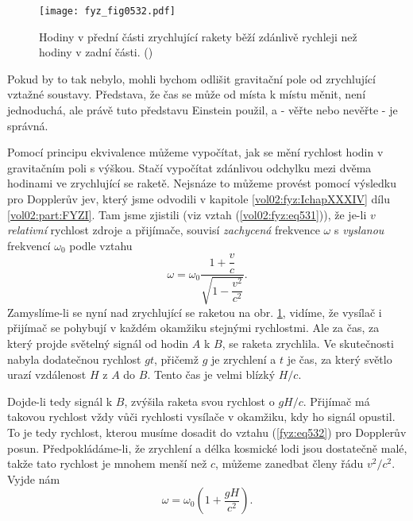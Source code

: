     \begin{figure}[ht!] %
      \centering
      \texttt{[image: fyz\_fig0532.pdf]}
      \caption{Hodiny v přední části zrychlující rakety běží zdánlivě rychleji než hodiny v zadní 
               části. (\cite[s.~787]{Feynman02})}
      \label{fyz:fig0532}
    \end{figure}
    
    Pokud by to tak nebylo, mohli bychom odlišit gravitační pole od zrychlující vztažné soustavy. 
    Představa, že čas se může od místa k místu měnit, není jednoduchá, ale právě tuto představu 
    Einstein použil, a - věřte nebo nevěřte - je správná.
    
    Pomocí principu ekvivalence můžeme vypočítat, jak se mění rychlost hodin v gravitačním poli s
    výškou. Stačí vypočítat zdánlivou odchylku mezi dvěma hodinami ve zrychlující se raketě.
    Nejsnáze to můžeme provést pomocí výsledku pro Dopplerův jev, který jsme odvodili v kapitole
    \ref{vol02:fyz:IchapXXXIV} dílu \ref{vol02:part:FYZI}. Tam jsme zjistili (viz vztah
    (\ref{vol02:fyz:eq531})), že je-li \(v\) \emph{relativní} rychlost zdroje a přijímače, souvisí
    \emph{zachycená} frekvence \(\omega\) s \emph{vyslanou} frekvencí \(\omega_0\) podle vztahu
    \begin{equation}\label{fyz:eq532}
      \omega = \omega_0\dfrac{1+\dfrac{v}{c}}{\sqrt{1-\dfrac{v^2}{c^2}}}.
    \end{equation}
    Zamyslíme-li se nyní nad zrychlující se raketou na obr. \ref{fyz:fig0532}, vidíme, že vysílač i 
    přijímač se pohybují v každém okamžiku stejnými rychlostmi. Ale za čas, za který projde 
    světelný signál od hodin \(A\) k \(B\), se raketa zrychlila. Ve skutečnosti nabyla dodatečnou 
    rychlost \(gt\), přičemž \(g\) je zrychlení a \(t\) je čas, za který světlo urazí vzdálenost 
    \(H\) z \(A\) do \(B\). Tento čas je velmi blízký \(H/c\). 
    
    Dojde-li tedy signál k \(B\), zvýšila raketa svou rychlost o \(gH/c\). Přijímač má takovou 
    rychlost vždy vůči rychlosti vysílače v okamžiku, kdy ho signál opustil. To je tedy rychlost, 
    kterou musíme dosadit do vztahu (\ref{fyz:eq532}) pro Dopplerův posun. Předpokládáme-li, že 
    zrychlení a délka kosmické lodi jsou dostatečně malé, takže tato rychlost je mnohem menší než 
    \(c\), můžeme zanedbat členy řádu \(v^2/c^2\). Vyjde nám
    \begin{equation}\label{fyz:eq533}
      \omega = \omega_0\left(1 + \dfrac{gH}{c^2}\right).
    \end{equation}
    
